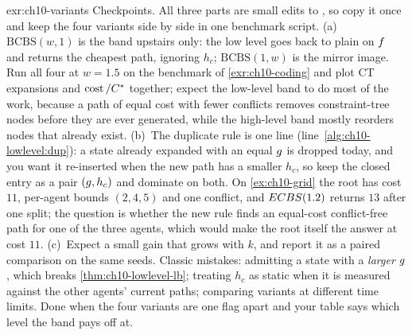 \begin{solution}{exr:ch10-variants}
Checkpoints. All three parts are small edits to , so copy it once and
keep the four variants side by side in one benchmark script. (a)~$\mathrm{BCBS}(w,1)$ is
the band upstairs only: the low level goes back to plain \astar on $f$ and returns
the cheapest path, ignoring $h_c$; $\mathrm{BCBS}(1,w)$ is the mirror image. Run all four
at $w=1.5$ on the benchmark of \cref{exr:ch10-coding} and plot CT expansions and
$\operatorname{cost}/C^*$ together; expect the low-level band to do most of the work, because a path of
equal cost with fewer conflicts removes constraint-tree nodes before they are ever
generated, while the high-level band mostly reorders nodes that already exist. (b)~The
duplicate rule is one line (line~\ref{alg:ch10-lowlevel:dup}): a state already expanded
with an equal $g$ is dropped today, and you want it re-inserted when the new path has
a smaller $h_c$, so keep the closed entry as a pair $(g,h_c)$ and dominate on both.
On \cref{ex:ch10-grid} the root has cost $11$, per-agent bounds $(2,4,5)$ and one
conflict, and $ECBS(1.2)$ returns $13$ after one split; the question is whether the new
rule finds an equal-cost conflict-free path for one of the three agents, which would make
the root itself the answer at cost $11$. (c)~Expect a small gain that grows with $k$, and
report it as a paired comparison on the same seeds. Classic mistakes: admitting a state
with a \emph{larger} $g$, which breaks \cref{thm:ch10-lowlevel-lb}; treating $h_c$ as
static when it is measured against the other agents' current paths; comparing variants at
different time limits. Done when the four variants are one flag apart and your table says
which level the band pays off at.
\end{solution}
